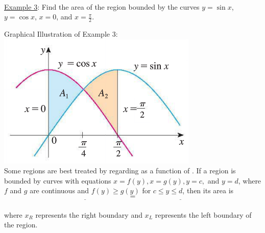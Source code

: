 \documentclass[paper=a4, fontsize=11pt]{scrartcl} %
\numberwithin{equation}{section} %
\numberwithin{figure}{section} %
\numberwithin{table}{section} %
\newcommand{\ds}{\displaystyle}
\begin{document}
  
  \indent\\
  \indent
  
  
\underline{Example 3}: Find the area of the region bounded by the curves $y=\sin x$, $y=\cos x$, $x=0$, and $x=\ds\frac{\pi}{2}$.\\

\vspace{3in}

\newpage
Graphical Illustration of Example 3:\\
\vspace{-10pt} \hspace{3in} \includegraphics[scale=0.4]{6-1-pic7.png}\\

Some regions are best treated by regarding \underline{\hspace{0.3in}} as a function of \underline{\hspace{0.3in}}. If a region is bounded by curves with equations $x=f(y), x=g(y), y=c,$ and $y=d$, where $f$ and $g$ are continuous and $f(y)\geq g(y)$ for $c\leq y\leq d$, then its area is\\

\[\underline{\hspace{2in}} = \underline{\hspace{2in}}\]\\


where $x_R$ represents the right boundary and $x_L$ represents the left boundary of the region.
\indent
\end{document}
